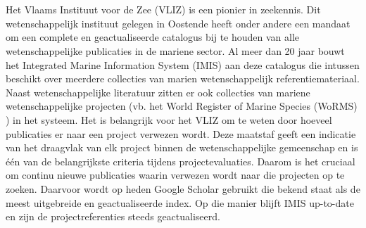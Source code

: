 
\chapter{}%
\label{ch:inleiding}

Het Vlaams Instituut voor de Zee (VLIZ) \autocite{Vliz2024} is een pionier in zeekennis. Dit wetenschappelijk instituut gelegen in Oostende heeft onder andere een mandaat om een complete en geactualiseerde catalogus bij te houden van alle wetenschappelijke publicaties in de mariene sector. Al meer dan 20 jaar bouwt het Integrated Marine Information System (IMIS) aan deze catalogus die intussen beschikt over meerdere collecties van marien wetenschappelijk referentiemateriaal.\\
Naast wetenschappelijke literatuur zitten er ook collecties van mariene wetenschappelijke projecten (vb. het World Register of Marine Species (WoRMS) \autocite{Worms2024}) in het systeem. Het is belangrijk voor het VLIZ om te weten door hoeveel publicaties er naar een project verwezen wordt. Deze maatstaf geeft een indicatie van het draagvlak van elk project binnen de wetenschappelijke gemeenschap en is één van de belangrijkste criteria tijdens projectevaluaties. Daarom is het cruciaal om continu nieuwe publicaties waarin verwezen wordt naar die projecten op te zoeken. Daarvoor wordt op heden Google Scholar gebruikt die bekend staat als de meest uitgebreide en geactualiseerde index. Op die manier blijft IMIS up-to-date en zijn de projectreferenties steeds geactualiseerd.

\section{}%
\label{sec:probleemstelling}

